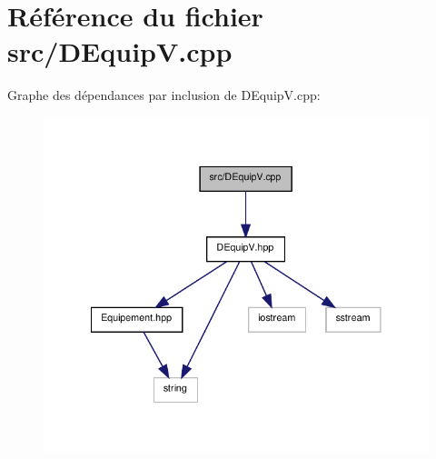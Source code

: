 \section{Référence du fichier src/\-D\-Equip\-V.cpp}
\label{_d_equip_v_8cpp}
Graphe des dépendances par inclusion de D\-Equip\-V.\-cpp\-:\nopagebreak
\begin{figure}[H]
\begin{center}
\leavevmode
\includegraphics[width=318pt]{_d_equip_v_8cpp__incl}
\end{center}
\end{figure}
